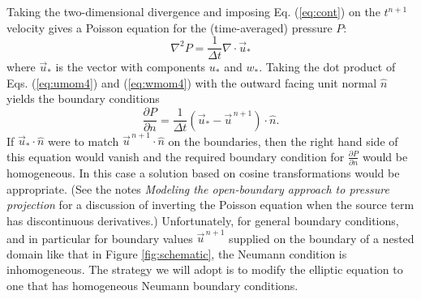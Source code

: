 \documentclass{jfm-like}
\begin{document}
Taking the two-dimensional divergence and imposing Eq. (\ref{eq:cont}) on the $t^{n+1}$ velocity gives a Poisson equation for the (time-averaged) pressure $P$:
\begin{equation}
\nabla^2 P = \frac{1}{\Delta t} \nabla \cdot {\vec u}_* 
\label{eq:poisson1}
\end{equation}
where $ {\vec u}_* $ is the vector with components $u_*$ and $w_*$.
Taking the dot product of Eqs. (\ref{eq:umom4}) and  (\ref{eq:wmom4}) with the outward facing unit normal ${\hat n}$ yields the boundary conditions
\begin{equation}
\frac{\partial P}{\partial n} = \frac{1}{\Delta t} ( {\vec u_*} - {\vec u^{\,n+1}} ) \cdot {\hat n}.
\end{equation}
If $ {\vec u_*} \cdot {\hat n}$ were to match $ {\vec u}^{\,n+1} \cdot {\hat n}$ on the boundaries, then the right hand side of this equation would vanish and the required boundary condition for $\frac{\partial P}{\partial n}$ would be homogeneous.
In this case  a solution based on cosine transformations would
be appropriate. (See the notes {\em Modeling the open-boundary approach to pressure projection} for a discussion of inverting the Poisson equation when the source term has discontinuous derivatives.)
Unfortunately, for general boundary conditions,  and in particular for  boundary values ${\vec u^{\,n+1}}$ supplied on the boundary of a nested domain like that in Figure \ref{fig:schematic}, the Neumann
condition is inhomogeneous. The strategy we will adopt is to modify the elliptic equation to one that has homogeneous Neumann boundary conditions.
\end{document}
